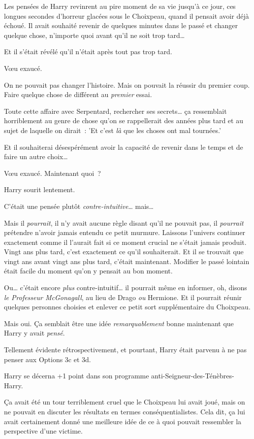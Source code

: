 Les pensées de Harry revinrent au pire moment de sa vie jusqu'à ce jour, ces longues secondes d'horreur glacées sous le Choixpeau, quand il pensait avoir déjà échoué. Il avait souhaité revenir de quelques minutes dans le passé et changer quelque chose, n'importe quoi avant qu'il ne soit trop tard…

Et il s'était révélé qu'il n'était après tout pas trop tard.

Vœu exaucé.

On ne pouvait pas changer l'histoire. Mais on pouvait la réussir du premier coup. Faire quelque chose de différent au \emph{premier} essai.

Toute cette affaire avec Serpentard, rechercher ses secrets… ça ressemblait horriblement au genre de chose qu'on se rappellerait des années plus tard et au sujet de laquelle on dirait~: 'Et c'est \emph{là} que les choses ont mal tournées.'

Et il souhaiterai désespérément avoir la capacité de revenir dans le temps et de faire un autre choix…

Vœu exaucé. Maintenant quoi~?

Harry sourit lentement.

C'était une pensée plutôt \emph{contre-intuitive}… mais…

Mais il \emph{pourrait}, il n'y avait aucune règle disant qu'il ne pouvait pas, il \emph{pourrait} prétendre n'avoir jamais entendu ce petit murmure. Laissons l'univers continuer exactement comme il l'aurait fait si ce moment crucial ne s'était jamais produit. Vingt ans plus tard, c'est exactement ce qu'il souhaiterait. Et il se trouvait que vingt ans avant vingt ans plus tard, c'était maintenant. Modifier le passé lointain était facile du moment qu'on y pensait au bon moment.

Ou… c'était encore \emph{plus} contre-intuitif… il pourrait même en informer, oh, disons \emph{le Professeur McGonagall}, au lieu de Drago \emph{ou} Hermione. Et il pourrait réunir quelques personnes choisies et enlever ce petit sort supplémentaire du Choixpeau.

Mais oui. Ça semblait être une idée \emph{remarquablement} bonne maintenant que Harry y avait \emph{pensé}.

Tellement évidente rétrospectivement, et pourtant, Harry était parvenu à ne pas penser aux Options 3c et 3d.

Harry se décerna +1 point dans son programme anti-Seigneur-des-Ténèbres-Harry.

Ça avait été un tour terriblement cruel que le Choixpeau lui avait joué, mais on ne pouvait en discuter les résultats en termes conséquentialistes. Cela dit, ça lui avait certainement donné une meilleure idée de ce à quoi pouvait ressembler la perspective d'une victime.

